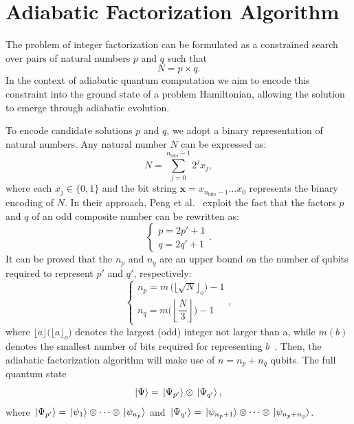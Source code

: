 \section{Adiabatic Factorization Algorithm}
\label{Section:AFA}

The problem of integer factorization can be formulated as a constrained search over pairs of natural numbers $p$ and $q$ such that
\begin{equation}
	N = p \times q.
	\label{eq:integer_factorization}
\end{equation}
In the context of adiabatic quantum computation we aim to encode this constraint into the ground state of a problem Hamiltonian, allowing the solution to emerge through adiabatic evolution.

To encode candidate solutions $p$ and $q$, we adopt a binary representation of natural numbers. Any natural number $N$ can be expressed as:
\begin{equation}
	N = \sum_{j=0}^{n_\text{bits} - 1} 2^j x_j,
	\label{eq:binary_integer}
\end{equation}
where each $x_j \in \{0,1\}$ and the bit string $\mathbf{x} = x_{n_\text{bits}-1} \dots x_0$ represents the binary encoding of $N$. In their approach, Peng et al.~\cite{peng_quantum_2008} exploit the fact that the factors $p$ and $q$ of an odd composite number can be rewritten as:
\begin{equation}
	\begin{cases}
		p = 2p' + 1 \\
		q = 2q' + 1
	\end{cases} .
	\label{eq:factors_simplification}
\end{equation}
It can be proved that the $n_p$ and $n_q$ are an upper bound on the number of qubits required to represent $p'$ and $q'$, respectively:
\begin{equation}
	\begin{cases}
		n_p = m\,\big(\lfloor \sqrt{N} \rfloor_o\big) - 1 \\[2ex]
		n_q = m\bigg(\left\lfloor \dfrac{N}{3} \right\rfloor \bigg) - 1
	\end{cases} ,
	\label{eq:factors_num_bits}
\end{equation}
where $\lfloor a \rfloor \big(\lfloor a \rfloor_o\big)$ denotes the largest (odd) integer not larger than a, while $m(b)$ denotes the smallest number of bits required for representing $b$~\cite{peng_quantum_2008}. Then, the adiabatic factorization algorithm will make use of $n = n_p + n_q$ qubits. The full quantum state 
\begin{equation}
	\ket{\Psi} = \ket*{\Psi_{p'}} \otimes \ket*{\Psi_{q'}},
	\label{eq:full_quantum_state}
\end{equation}
where $\ket*{\Psi_{p'}} = \ket*{\psi_{1}}\otimes \cdots \otimes \ket*{\psi_{n_p}}$ and $\ket*{\Psi_{q'}} = \ket*{\psi_{n_p+1}}\otimes \cdots \otimes \ket*{\psi_{n_p +n_q}}$.

